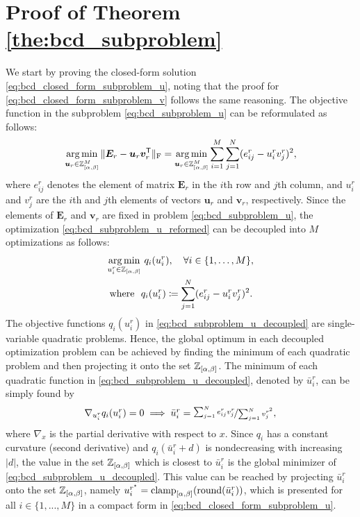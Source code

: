 \appendix

\section{Proof of Theorem \ref{the:bcd_subproblem}} \label{app:monotonicity_proof}

We start by proving the closed-form solution \eqref{eq:bcd_closed_form_subproblem_u}, noting that the proof for \eqref{eq:bcd_closed_form_subproblem_v} follows the same reasoning.
The objective function in the subproblem \eqref{eq:bcd_subproblem_u} can be reformulated as follows:
\begin{align}
    \operatorname*{arg\,min}_{\bm{u}_r \in \mathbb{Z}_{[\alpha,\beta]}^M} \|\bm{E}_r - \bm{u}_r \bm{v}_r^\mathsf{T}\|_{\rm F}
    = \operatorname*{arg\,min}_{\bm{u}_r \in \mathbb{Z}_{[\alpha,\beta]}^M}\sum_{i=1}^M \sum_{j=1}^N (e_{ij}^r - u_i^r v_j^r)^2,
    \label{eq:bcd_subproblem_u_reformed}
\end{align}
where $e_{ij}^r$ denotes the element of matrix $\bm{E}_r$ in the $i$th row and $j$th column, and $u_i^r$ and $v_j^r$ are the $i$th and $j$th elements of vectors $\bm{u}_r$ and $\bm{v}_r$, respectively. Since the elements of $\bm{E}_r$ and $\bm{v}_r$ are fixed in problem \eqref{eq:bcd_subproblem_u}, the optimization \eqref{eq:bcd_subproblem_u_reformed} can be decoupled into $M$ optimizations as follows:
\begin{align}
    \operatorname*{arg\,min}_{u^r_i \in \mathbb{Z}_{[\alpha,\beta]}} & ~q_i(u_i^r), \quad \forall i\in\{1,\dots,M\}, \nonumber       \\
    \textstyle \text{where} ~~              & q_i(u_i^r) \coloneqq \sum_{j=1}^N (e_{ij}^r - u_i^r v_j^r)^2.
    \label{eq:bcd_subproblem_u_decoupled}
\end{align}
The objective functions $q_i(u_i^r)$ in \eqref{eq:bcd_subproblem_u_decoupled} are single-variable quadratic problems. Hence, the global optimum in each decoupled optimization problem can be achieved by finding the minimum of each quadratic problem and then projecting it onto the set $\mathbb{Z}_{[\alpha,\beta]}$. The minimum of each quadratic function in \eqref{eq:bcd_subproblem_u_decoupled}, denoted by $\bar{u}_i^r$, can be simply found by
\begin{align}
    \textstyle \nabla_{u_i^r} q_i(u_i^r) = 0 \implies \bar{u}_i^r = \nicefrac{\sum_{j=1}^N e_{ij}^r v_j^r}{\sum_{j=1}^N v_j^{r^2}},
    \label{eq:bcd_subproblem_u_minimum}
\end{align}
where $\nabla_x$ is the partial derivative with respect to $x$.
Since $q_i$ has a constant curvature (second derivative) and $q_i(\bar{u}_i^r + d)$ is nondecreasing with increasing $|d|$, the value in the set $\mathbb{Z}_{[\alpha,\beta]}$ which is closest to $\bar{u}_i^r$ is the global minimizer of \eqref{eq:bcd_subproblem_u_decoupled}. This value can be reached by projecting $\bar{u}_i^r$ onto the set $\mathbb{Z}_{[\alpha,\beta]}$, namely $u^{r^\star}_i = \operatorname{clamp}_{[\alpha,\beta]}(\operatorname{round}(\bar{u}_i^r))$, which is presented for all $i\in\{1,...,M\}$ in a compact form in \eqref{eq:bcd_closed_form_subproblem_u}.

